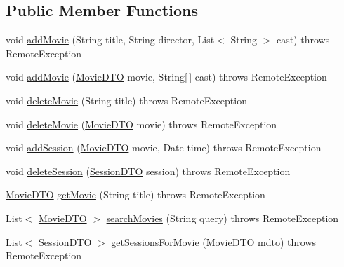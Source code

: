 \subsection*{Public Member Functions}
\begin{DoxyCompactItemize}
\item 
void \mbox{\hyperlink{interfacees_1_1deusto_1_1server_1_1_i_server_a393d8689e14b3534dfa425e4c900532e}{add\+Movie}} (String title, String director, List$<$ String $>$ cast)  throws Remote\+Exception
\item 
void \mbox{\hyperlink{interfacees_1_1deusto_1_1server_1_1_i_server_a9567844dce410325c606945c8d7c4dac}{add\+Movie}} (\mbox{\hyperlink{classes_1_1deusto_1_1server_1_1data_1_1_movie_d_t_o}{Movie\+D\+TO}} movie, String\mbox{[}$\,$\mbox{]} cast)  throws Remote\+Exception
\item 
void \mbox{\hyperlink{interfacees_1_1deusto_1_1server_1_1_i_server_a0b3243dc04d49f7659fefec4e4fb43b7}{delete\+Movie}} (String title)  throws Remote\+Exception
\item 
void \mbox{\hyperlink{interfacees_1_1deusto_1_1server_1_1_i_server_a98cc625828e17ef8b55aefcd9a3f604e}{delete\+Movie}} (\mbox{\hyperlink{classes_1_1deusto_1_1server_1_1data_1_1_movie_d_t_o}{Movie\+D\+TO}} movie)  throws Remote\+Exception
\item 
void \mbox{\hyperlink{interfacees_1_1deusto_1_1server_1_1_i_server_a6dea6fa95033d6339b3da87217adad77}{add\+Session}} (\mbox{\hyperlink{classes_1_1deusto_1_1server_1_1data_1_1_movie_d_t_o}{Movie\+D\+TO}} movie, Date time)  throws Remote\+Exception
\item 
void \mbox{\hyperlink{interfacees_1_1deusto_1_1server_1_1_i_server_a69878460a3fb5dfc077308e1cd3a8d34}{delete\+Session}} (\mbox{\hyperlink{classes_1_1deusto_1_1server_1_1data_1_1_session_d_t_o}{Session\+D\+TO}} session)  throws Remote\+Exception
\item 
\mbox{\hyperlink{classes_1_1deusto_1_1server_1_1data_1_1_movie_d_t_o}{Movie\+D\+TO}} \mbox{\hyperlink{interfacees_1_1deusto_1_1server_1_1_i_server_a2b7883e416d98a7c92de13cbed7af450}{get\+Movie}} (String title)  throws Remote\+Exception
\item 
List$<$ \mbox{\hyperlink{classes_1_1deusto_1_1server_1_1data_1_1_movie_d_t_o}{Movie\+D\+TO}} $>$ \mbox{\hyperlink{interfacees_1_1deusto_1_1server_1_1_i_server_a50b7dacdeb04d5f1ee3f3b59989ed117}{search\+Movies}} (String query)  throws Remote\+Exception
\item 
List$<$ \mbox{\hyperlink{classes_1_1deusto_1_1server_1_1data_1_1_session_d_t_o}{Session\+D\+TO}} $>$ \mbox{\hyperlink{interfacees_1_1deusto_1_1server_1_1_i_server_a33dc65de2a567be10bf2477ee28765f8}{get\+Sessions\+For\+Movie}} (\mbox{\hyperlink{classes_1_1deusto_1_1server_1_1data_1_1_movie_d_t_o}{Movie\+D\+TO}} mdto)  throws Remote\+Exception

\end{DoxyCompactItemize}
